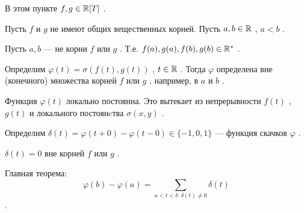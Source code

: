 \SSbullet

В этом пункте \( f,g \in \mathbb{R}[T] \) .

\SSsect Пусть \( f \) и \( g \) не имеют общих вещественных корней. 
Пусть \( a,b \in \mathbb{R} \) , \( a < b \) .

\SSsect Пусть \( a,b \) --- не корни \( f \) или \( g \) .
Т.е. \( f(a),g(a),f(b),g(b) \in \mathbb{R}^* \) .

\SSsect[def] Определим \( \varphi(t) = \sigma(f(t),g(t)) \) , \( t \in \mathbb{R} \) .
Тогда \( \varphi \) определена вне (конечного) множества корней \( f \) или \( g \) ,
например, в \( a \) и \( b \) .

\SSsect Функция \( \varphi(t) \) локально постоянна. Это вытекает из непрерывности \( f(t) \) ,
\( g(t) \) и локального постоянcтва \( \sigma(x,y) \) .

\vspace
{}


\SSsect[def] Определим \( \delta(t) = \varphi(t+0) - \varphi(t-0) \in \{-1,0,1\} \) --- 
функция скачков \( \varphi \) .

\SSsect \( \delta(t) = 0 \) вне корней \( f \) или \( g \) .

\SSsect[!!] Главная теорема:
\[ \varphi(b) - \varphi(a) = \sum_{ a<t<b \enspace \delta(t) \neq 0   } \delta(t) \] .

\SSsect

\SSsect

\SSsect

\SSsect

\SSsect

\SSsect

\SSsect

\vspace

\SSbullet

\SSbullet




